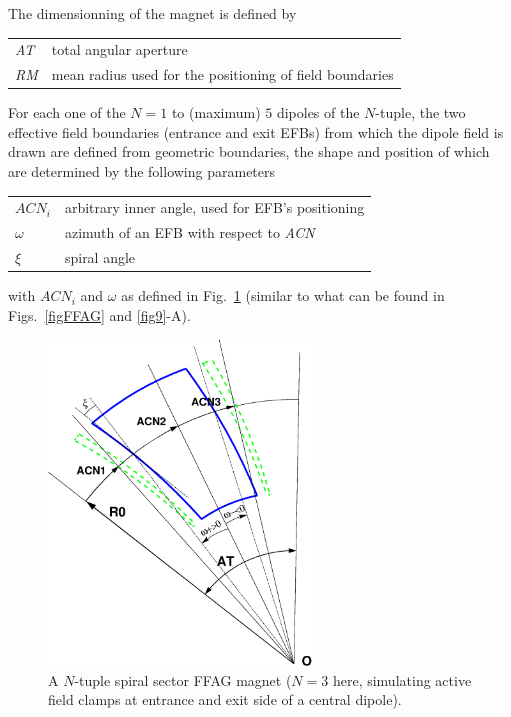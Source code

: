 \bigskip

\noindent  The dimensionning of the magnet is defined by

\bigskip

 \begin{tabular}{>{\sl}l!{~:}l}
	 AT &  total angular aperture \\
	 RM & mean radius used for the positioning of field boundaries\\
 \end{tabular}

\bigskip

\noindent For each one of the $N=1$ to (maximum) $5$ dipoles of the  $N$-tuple, 
the two  effective field boundaries (entrance and exit EFBs) from which  the dipole field  is drawn are
defined from geometric boundaries, the shape and position of which are determined by the 
following parameters 

\bigskip

\begin{tabular}{l!{~:}l}
	$ACN_i$  & arbitrary inner angle, used for EFB's positioning  \\
	$\omega$ &  azimuth of an EFB with respect to  \textsl{ACN}\\
	$\xi$ & spiral angle \\
\end{tabular}

\bigskip

\noindent with $ACN_i$ and $\omega$ as defined in Fig.~\ref{figFFAGSPI} 
(similar to what can be found in Figs.~\ref{figFFAG} and \ref{fig9}-A). 

\begin{figure}[h]
 \begin{center}
\includegraphics[width=7cm]{figFFAGSPI.eps}  
 \caption{ \label{figFFAGSPI}
A $N$-tuple spiral sector FFAG magnet ($N=3$ here, simulating active field clamps at 
entrance and exit side of a central dipole). 
}
  \end{center}
\end{figure}


